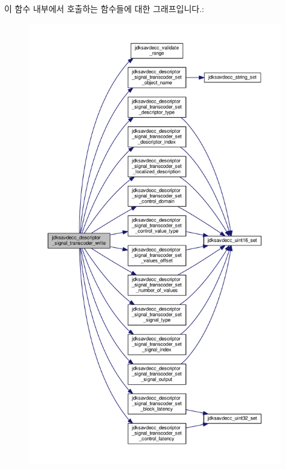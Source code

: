 이 함수 내부에서 호출하는 함수들에 대한 그래프입니다.\+:
\nopagebreak
\begin{figure}[H]
\begin{center}
\leavevmode
\includegraphics[height=550pt]{group__descriptor__transcoder_ga8326d2720c6304ae2751c772acf54282_cgraph}
\end{center}
\end{figure}


